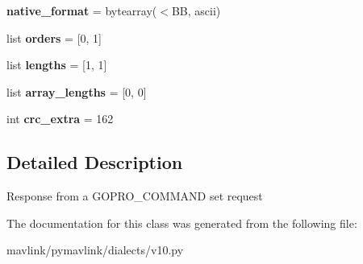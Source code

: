 \begin{DoxyCompactItemize}
{\bfseries native\+\_\+format} = bytearray(\textquotesingle{}$<$BB\textquotesingle{}, \textquotesingle{}ascii\textquotesingle{})
\item 
\mbox{\label{classpymavlink_1_1dialects_1_1v10_1_1MAVLink__gopro__set__response__message_aea303e2f0d7fab0bc623930c7af415bc}} 
list {\bfseries orders} = \mbox{[}0, 1\mbox{]}
\item 
\mbox{\label{classpymavlink_1_1dialects_1_1v10_1_1MAVLink__gopro__set__response__message_a2f957844cbfd5f9b712c356546451cf3}} 
list {\bfseries lengths} = \mbox{[}1, 1\mbox{]}
\item 
\mbox{\label{classpymavlink_1_1dialects_1_1v10_1_1MAVLink__gopro__set__response__message_a3e646ee5740dd234724d8707220ede46}} 
list {\bfseries array\+\_\+lengths} = \mbox{[}0, 0\mbox{]}
\item 
\mbox{\label{classpymavlink_1_1dialects_1_1v10_1_1MAVLink__gopro__set__response__message_a976c9f59af03db9a8e9774cffbc27fa7}} 
int {\bfseries crc\+\_\+extra} = 162
\end{DoxyCompactItemize}


\subsection{Detailed Description}
\begin{DoxyVerb}Response from a GOPRO_COMMAND set request
\end{DoxyVerb}
 

The documentation for this class was generated from the following file\+:\begin{DoxyCompactItemize}
\item 
mavlink/pymavlink/dialects/v10.\+py\end{DoxyCompactItemize}
